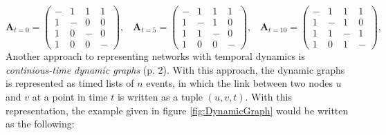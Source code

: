 \begin{equation}
    \textbf{A}_{t=0} = \begin{pmatrix}
                - & 1 & 1 & 1\\
                1 & - & 0 & 0\\
                1 & 0 & - & 0\\
                1 & 0 & 0 & -
                \end{pmatrix}, \hspace{10pt}
    \textbf{A}_{t=5} = \begin{pmatrix}
                - & 1 & 1 & 1\\
                1 & - & 1 & 0\\
                1 & 1 & - & 0\\
                1 & 0 & 0 & -
                \end{pmatrix}, \hspace{10pt}
    \textbf{A}_{t=10} = \begin{pmatrix}
                - & 1 & 1 & 1\\
                1 & - & 1 & 0\\
                1 & 1 & - & 1\\
                1 & 0 & 1 & -
                \end{pmatrix}, \hspace{10pt}
\end{equation}
\noindent
Another approach to representing networks with temporal dynamics is \textit{continious-time dynamic graphs} \cite{Rossi2020TEMPORALGRAPHS} (p. 2).
With this approach, the dynamic graphs is represented as timed lists of $n$ events, in which the link between two nodes $u$ and $v$ at a point in time $t$ is written as a tuple $(u, v, t)$.
With this representation, the example given in figure \ref{fig:DynamicGraph} would be written as the following:

